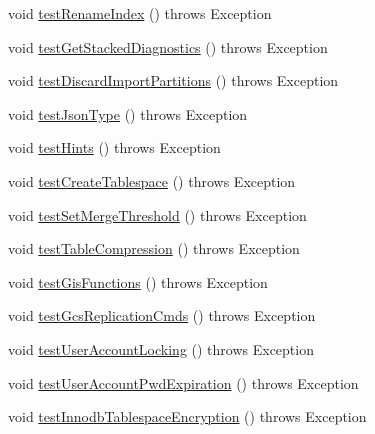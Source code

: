 \begin{DoxyCompactItemize}
\item 
void \mbox{\hyperlink{classtestsuite_1_1regression_1_1_syntax_regression_test_ab5d200050de3d77c76405bdda78d95a6}{test\+Rename\+Index}} ()  throws Exception 
\item 
void \mbox{\hyperlink{classtestsuite_1_1regression_1_1_syntax_regression_test_a1bf8ec597fe6c78a3e994f1695fbca2b}{test\+Get\+Stacked\+Diagnostics}} ()  throws Exception 
\item 
void \mbox{\hyperlink{classtestsuite_1_1regression_1_1_syntax_regression_test_afc4ff038b496b874730ce01838d0be46}{test\+Discard\+Import\+Partitions}} ()  throws Exception 
\item 
void \mbox{\hyperlink{classtestsuite_1_1regression_1_1_syntax_regression_test_a5490dab20bfc43225f9eb3fbf812e349}{test\+Json\+Type}} ()  throws Exception 
\item 
void \mbox{\hyperlink{classtestsuite_1_1regression_1_1_syntax_regression_test_a0ce60cad9433c889e455f260ea073888}{test\+Hints}} ()  throws Exception 
\item 
void \mbox{\hyperlink{classtestsuite_1_1regression_1_1_syntax_regression_test_ad1acd7d881976285b80df9ddb0a44558}{test\+Create\+Tablespace}} ()  throws Exception 
\item 
void \mbox{\hyperlink{classtestsuite_1_1regression_1_1_syntax_regression_test_a2a908e2479002b77f56fe61e6f25b244}{test\+Set\+Merge\+Threshold}} ()  throws Exception 
\item 
void \mbox{\hyperlink{classtestsuite_1_1regression_1_1_syntax_regression_test_ad83b1c216b65beb75abd988b87c801dc}{test\+Table\+Compression}} ()  throws Exception 
\item 
void \mbox{\hyperlink{classtestsuite_1_1regression_1_1_syntax_regression_test_a5093357371fd3056075bdda8c5853c9f}{test\+Gis\+Functions}} ()  throws Exception 
\item 
void \mbox{\hyperlink{classtestsuite_1_1regression_1_1_syntax_regression_test_a9382d1a11f854af3618cda075f001204}{test\+Gcs\+Replication\+Cmds}} ()  throws Exception 
\item 
void \mbox{\hyperlink{classtestsuite_1_1regression_1_1_syntax_regression_test_a3da9a690faaf10c2046b6ba25f7a092a}{test\+User\+Account\+Locking}} ()  throws Exception 
\item 
void \mbox{\hyperlink{classtestsuite_1_1regression_1_1_syntax_regression_test_a3b24b59ae1c99620e5666390a7b80119}{test\+User\+Account\+Pwd\+Expiration}} ()  throws Exception 
\item 
void \mbox{\hyperlink{classtestsuite_1_1regression_1_1_syntax_regression_test_a1f0cfdcb063613f04cf8941bdf34de94}{test\+Innodb\+Tablespace\+Encryption}} ()  throws Exception 
\end{DoxyCompactItemize}
